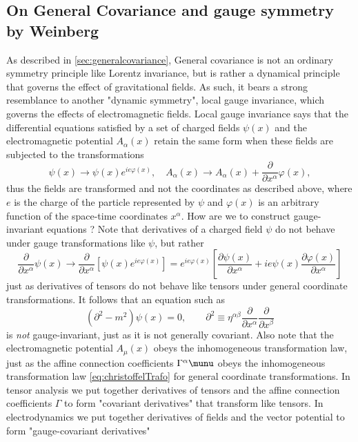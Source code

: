 \subsection{On General Covariance and gauge symmetry by Weinberg}
As described in \ref{sec:generalcovariance}, General covariance is not an ordinary symmetry principle like Lorentz invariance, but is rather a dynamical principle that governs the effect of gravitational fields. As such, it bears a strong resemblance to another "dynamic symmetry", local gauge invariance, which governs the effects of electromagnetic fields. Local gauge invariance says that the differential equations satisfied by a set of charged fields $\psi(x)$ and the electromagnetic potential $A_\alpha(x)$ retain the same form when these fields are subjected to the transformations
\begin{equation}
\label{eq:EMgaugetrafo}
	\psi(x) \rightarrow \psi(x) e^{i e \varphi(x)}, \quad A_\alpha(x) \rightarrow A_{\alpha} (x) + \frac{\partial }{\partial x^\alpha} \varphi(x),
\end{equation}
thus the fields are transformed and not the coordinates as described above, where $e$ is the charge of the particle represented by $\psi$ and $\varphi(x)$ is an arbitrary function of the space-time coordinates $x^\alpha$. How are we to construct gauge-invariant equations ? Note that derivatives of a charged field $\psi$ do not behave under gauge transformations like $\psi$, but rather
\begin{equation}
	\frac{\partial}{\partial x^\alpha} \psi(x) \rightarrow \frac{\partial}{\partial x^\alpha }\left[\psi (x)e^{i e \varphi(x)} \right]=e^{ie\varphi(x)} \left[\frac{\partial \psi(x)}{\partial x^\alpha} + i e \psi(x) \frac{\partial \varphi(x)}{\partial x^\alpha}\right]
\end{equation}
just as derivatives of tensors do not behave like tensors under general coordinate transformations. It follows that an equation such as
\begin{equation}
	\left(\partial^2 - m^2\right) \psi(x) =0,\qquad \partial^2\equiv \eta^{\alpha  \beta} \frac{\partial}{\partial x^\alpha} \frac{\partial}{\partial x^\beta}
\end{equation}
is \emph{not} gauge-invariant, just as it is not generally covariant. Also note that the electromagnetic potential $A_\mu(x)$ obeys the inhomogeneous transformation law, just as the affine connection coefficients $\Gamma^\alpha\munu$ obeys the inhomogeneous transformation law \ref{eq:christoffelTrafo} for general coordinate transformations. In tensor analysis we put together derivatives of tensors and the affine connection coefficients $\Gamma$ to form "covariant derivatives" that transform like tensors. In electrodynamics we put together derivatives of fields and the vector potential to form "gauge-covariant derivatives"
